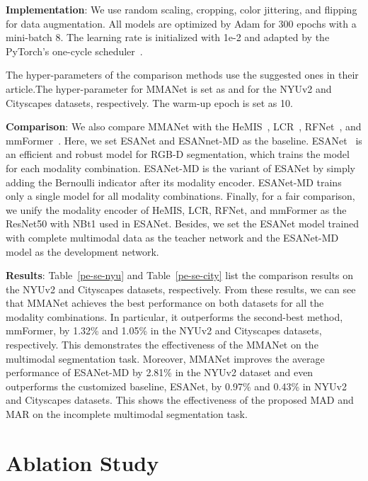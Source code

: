 \documentclass[10pt,twocolumn,letterpaper]{article}
\begin{document}
\textbf{Implementation}: We use random scaling, cropping, color jittering, and flipping for data augmentation. All models are optimized by Adam for 300 epochs with a mini-batch 8. The learning rate is initialized with 1e-2 and adapted by the PyTorch’s one-cycle scheduler~\cite{onecycle}. 



The hyper-parameters of the comparison methods use the suggested ones in their article.The hyper-parameter  for MMANet is set as  and  for the NYUv2 and Cityscapes datasets, respectively. The warm-up epoch  is set as 10.




\textbf{Comparison}: We also compare MMANet with the HeMIS~\cite{hemis}, LCR~\cite{lcr}, RFNet~\cite{rfnet}, and mmFormer~\cite{mmformer}. Here, we set ESANet and ESANnet-MD as the baseline. ESANet~\cite{ESANet} is an efficient and robust model for RGB-D segmentation, which trains the model for each modality combination. ESANet-MD is the variant of ESANet by simply adding the Bernoulli indicator after its modality encoder. ESANet-MD trains only a single model for all modality combinations. Finally, for a fair comparison, we unify the modality encoder of HeMIS, LCR, RFNet, and mmFormer as the ResNet50 with NBt1 used in ESANet. Besides, we set the ESANet model trained with complete multimodal data as the teacher network and the ESANet-MD model as the development network.


\textbf{Results}: Table~\ref{pe-se-nyu} and Table~\ref{pe-se-city} list the comparison results on the NYUv2 and Cityscapes datasets, respectively. From these results, we can see that MMANet achieves the best performance on both datasets for all the modality combinations. In particular, it outperforms the second-best method, mmFormer, by 1.32\% and 1.05\% in the NYUv2 and Cityscapes datasets, respectively. This demonstrates the effectiveness of the MMANet on the multimodal segmentation task. Moreover, MMANet improves the average performance of ESANet-MD by 2.81\% in the NYUv2 dataset and even outperforms the customized baseline, ESANet, by 0.97\% and 0.43\% in NYUv2 and Cityscapes datasets. This shows the effectiveness of the proposed MAD and MAR on the incomplete multimodal segmentation task.







\section{Ablation Study}
\end{document}
